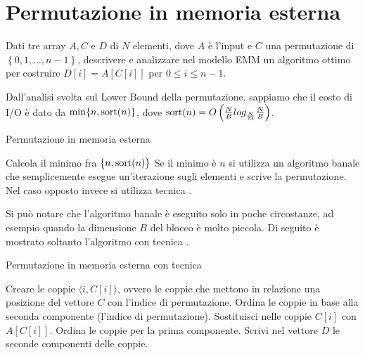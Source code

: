 \chapter{Permutazione in memoria esterna}

\begin{problem*}
    Dati tre array \(A, C\) e \(D\) di \(N\) elementi, dove \(A\) \`e l'input e 
    \(C\) una permutazione di \(\left\{0,1,\dots ,n-1\right\}\), descrivere e
    analizzare nel modello EMM un algoritmo ottimo per costruire
    \(D[i]=A[C[i]]\) per \(0\le i\le n-1\).
\end{problem*}

Dall'analisi svolta sul Lower Bound della permutazione, sappiamo che il costo di
I/O è dato da \(\min\{n, \mbox{sort}(n)\}\), dove \(\mbox{sort}(n) =
O\left(\frac{N}{B}log_\frac{N}{M} \frac{N}{B}\right)\).
 
\begin{algorithm}
    \caption{Permutazione in memoria esterna}
    \begin{algorithmic}[1]
        \State Calcola il minimo fra \(\{n, \mbox{sort}(n)\}\)
        \State Se il minimo è \(n\) si utilizza un algoritmo banale che semplicemente esegue un'iterazione sugli elementi e scrive la permutazione.
        \State Nel caso opposto invece si utilizza tecnica \mapreduce.
    \end{algorithmic}	
\end{algorithm}

Si può notare che l'algoritmo banale è eseguito solo in poche circostanze,
ad esempio quando la dimensione \(B\) del blocco è molto piccola. Di seguito
è mostrato soltanto l'algoritmo con tecnica \mapreduce.
 
\begin{algorithm}
    \caption{Permutazione in memoria esterna con tecnica \mapreduce}
    \begin{algorithmic}[1]
        \State Creare le coppie \(\langle i,C[i] \rangle\), ovvero le coppie che mettono in relazione una posizione del vettore \(C\) con l'indice di permutazione.
        \State Ordina le coppie in base alla seconda componente (l'indice di permutazione).
        \State Sostituisci nelle coppie \(C[i]\) con \(A[C[i]]\).
        \State Ordina le coppie per la prima componente.
        \State Scrivi nel vettore \(D\) le seconde componenti delle coppie.
    \end{algorithmic}	
\end{algorithm}

